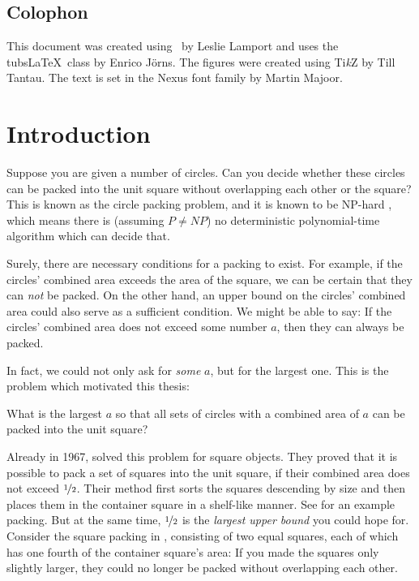 \documentclass[a4paper,style=print,oneside,bibliography=totoc,nexus,lnum,extramargin]{tubsbook}
\begin{document}
\section*{Colophon}

This document was created using \LaTeXe\ by Leslie Lamport and uses the tubs\LaTeX\ class by Enrico Jörns. The figures were created using Ti\textit{k}Z by Till Tantau. The text is set in the Nexus font family by Martin Majoor.

\cleardoublepage
\setcounter{tocdepth}{1}

\tableofcontents
\cleardoublepage

\mainmatter %

\chapter{Introduction}

Suppose you are given a number of circles. Can you decide whether these circles can be packed into the unit square without overlapping each other or the square? This is known as the circle packing problem, and it is known to be NP-hard \cite{DFL2010circle}, which means there is (assuming $P \ne NP$) no deterministic polynomial-time algorithm which can decide that.


Surely, there are necessary conditions for a packing to exist. For example, if the circles' combined area exceeds the area of the square, we can be certain that they can \emph{not} be packed.
On the other hand, an upper bound on the circles' combined area could also serve as a sufficient condition. We might be able to say: If the circles' combined area does not exceed some number $a$, then they can always be packed.

In fact, we could not only ask for \emph{some} $a$, but for the largest one. This is the problem which motivated this thesis:

\begin{problem}\label{prb:1}
    What is the largest $a$ so that all sets of circles with a combined area of $a$ can be packed into the unit square?
\end{problem}

Already in 1967, \textcite{MM1967some} solved this problem for square objects. They proved that it is possible to pack a set of squares into the unit square, if their combined area does not exceed $\nicefrac{1}{2}$. Their method first sorts the squares descending by size and then places them in the container square in a shelf-like manner. See  for an example packing. But at the same time, $\nicefrac{1}{2}$ is the \emph{largest upper bound} you could hope for. Consider the square packing in , consisting of two equal squares, each of which has one fourth of the container square's area: If you made the squares only slightly larger, they could no longer be packed without overlapping each other.
\end{document}
